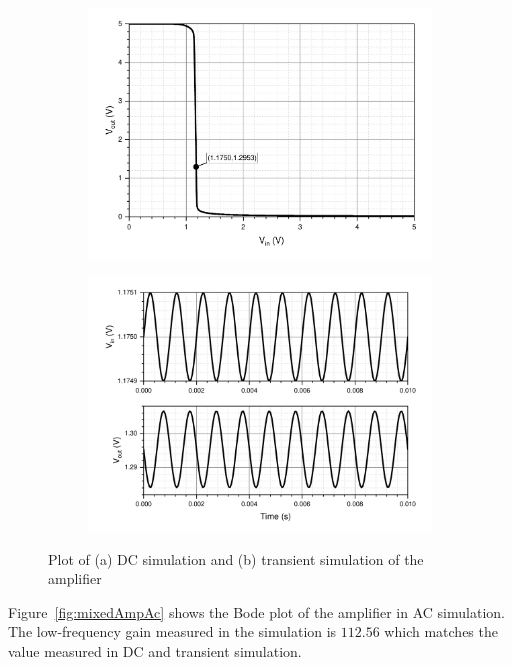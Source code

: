 \documentclass[12pt]{article}   %
\begin{document}
	\begin{figure}[htbp]
		\centering
		\begin{subfigure}{0.48\linewidth}
			\includegraphics[width=\linewidth]{Figures/E3_Current_Mirror/mixed_amp_dc}
			\caption{}
			\label{fig:mixedAmpDc}
		\end{subfigure}
		\begin{subfigure}{0.48\linewidth}
			\includegraphics[width=\linewidth]{Figures/E3_Current_Mirror/mixed_amp_tran}
			\caption{}
			\label{fig:mixedAmpTran}
		\end{subfigure}
		\caption{Plot of (a) DC simulation and (b) transient simulation of the amplifier}
	\end{figure}
	
	Figure~\ref{fig:mixedAmpAc} shows the Bode plot of the amplifier in AC simulation. The low-frequency gain measured in the simulation is $112.56$ which matches the value measured in DC and transient simulation.
	
\end{document}

